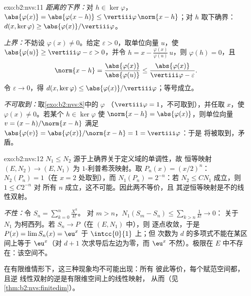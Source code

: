 \begin{solution}{exo:b2:nvs:11}
\emph{距离的下界：}对 $h \in \ker\varphi$，
$\abs{\varphi(x)} = \abs{\varphi(x - h)} \leq
\vertiii\varphi\,\norm{x - h}$；对 $h$ 取下确界：
$d(x, \ker\varphi) \geq \abs{\varphi(x)}/\vertiii\varphi$。

\emph{上界：}不妨设 $\varphi(x) \neq 0$。给定
$\varepsilon > 0$，取单位向量 $u$，使 $\abs{\varphi(u)} \geq
\vertiii\varphi - \varepsilon > 0$，并令 $h = x -
\frac{\varphi(x)}{\varphi(u)}\,u$，则 $\varphi(h) = 0$，且
\[
\norm{x - h} = \frac{\abs{\varphi(x)}}{\abs{\varphi(u)}}
\leq \frac{\abs{\varphi(x)}}{\vertiii\varphi - \varepsilon}.
\]
令 $\varepsilon \to 0$，得 $d(x, \ker\varphi) \leq
\abs{\varphi(x)}/\vertiii\varphi$；等号成立。

\emph{不可取到：}取\cref{exo:b2:nvs:8}中的 $\varphi$
（$\vertiii\varphi = 1$，不可取到），并任取 $x$，使
$\varphi(x) \neq 0$。若某个 $h \in \ker\varphi$ 使
$\norm{x - h} = \abs{\varphi(x)}$，则单位向量 $v = (x -
h)/\norm{x - h}$ 满足 $\abs{\varphi(v)} =
\abs{\varphi(x)}/\norm{x - h} = 1 = \vertiii\varphi$：于是
将被取到，矛盾。
\end{solution}

\begin{solution}{exo:b2:nvs:12}
$N_1 \leq N_2$ 源于上确界关于定义域的单调性，故
恒等映射 $(E, N_2) \to (E, N_1)$ 为 $1$-利普希茨映射。取 $P_n(x) =
(x/2)^n$：$N_2(P_n) = 1$（在 $x = 2$ 处取到），而 $N_1(P_n) =
2^{-n}$：若 $N_2 \leq CN_1$ 成立，则 $1 \leq C2^{-n}$ 对
所有 $n$ 成立，这不可能。因此两不等价，且
其逆恒等映射是不的线性双射。

\emph{不性：}令 $S_n = \sum_{k=0}^{n}\frac{X^k}{k!}$。
对 $m > n$，$N_1(S_m - S_n) \leq \sum_{k>n}\frac1{k!} \to 0$：
关于 $N_1$ 为柯西列。若 $S_n \to P$（在 $(E, N_1)$ 中），则
逐点收敛，于是 $P(x) = \lim S_n(x) = \eu^x$ 于 $\intcc{0}{1}$ 上；但
次数为 $d$ 的多项式不能在某区间上等于 $\eu^x$（对
$d + 1$ 次求导后左边为零，而 $\eu^x$ 不然）。极限在
$E$ 中不存在：该空间不。

在有限维情形下，这三种现象均不可能出现：所有
彼此等价，每个赋范空间都，且逆
线性双射的逆是有限维空间上的线性映射，
从而（见\cref{thm:b2:nvs:finitedim}）。
\end{solution}

